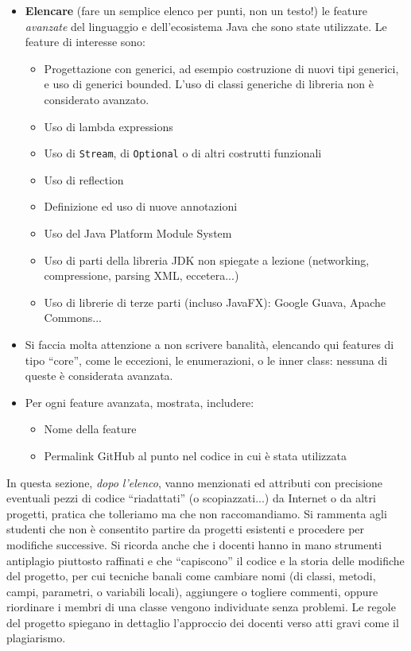 \documentclass[a4paper,12pt]{report}
\begin{document}
	\begin{itemize}
		\item \textbf{Elencare} (fare un semplice elenco per punti, non un testo!) le feature \textit{avanzate} del linguaggio e dell'ecosistema Java che sono state
		utilizzate. Le feature di interesse sono:
		\begin{itemize}
			\item Progettazione con generici, ad esempio costruzione di nuovi tipi generici, e uso di generici bounded.
			L'uso di classi generiche di libreria non è considerato avanzato.
			\item Uso di lambda expressions
			\item Uso di \texttt{Stream}, di \texttt{Optional} o di altri costrutti funzionali
			\item Uso di reflection
			\item Definizione ed uso di nuove annotazioni
			\item Uso del Java Platform Module System
			\item Uso di parti della libreria JDK non spiegate a lezione (networking, compressione, parsing XML, eccetera...)
			\item Uso di librerie di terze parti (incluso JavaFX): Google Guava, Apache Commons...
		\end{itemize}
		\item Si faccia molta attenzione a non scrivere banalità, elencando qui features di tipo ``core'', come le eccezioni, le enumerazioni, o le inner class: nessuna di queste è considerata avanzata.
		\item Per ogni feature avanzata, mostrata, includere:
		\begin{itemize}
			\item Nome della feature
			\item Permalink GitHub al punto nel codice in cui è stata utilizzata
		\end{itemize}
	\end{itemize}
	
	In questa sezione, \textit{dopo l'elenco},
	vanno menzionati ed attributi con precisione eventuali pezzi di codice ``riadattati'' (o scopiazzati...) da Internet o da altri progetti,
	pratica che tolleriamo ma che non raccomandiamo.
	Si rammenta agli studenti che non è consentito partire da progetti esistenti e procedere per modifiche successive.
	Si ricorda anche che i docenti hanno in mano strumenti antiplagio piuttosto raffinati e che ``capiscono'' il codice e la storia delle modifiche del progetto,
	per cui tecniche banali come cambiare nomi (di classi, metodi, campi, parametri, o variabili locali),
	aggiungere o togliere commenti,
	oppure riordinare i membri di una classe vengono individuate senza problemi.
	Le regole del progetto spiegano in dettaglio l'approccio dei docenti verso atti gravi come il plagiarismo.
	
\end{document}
